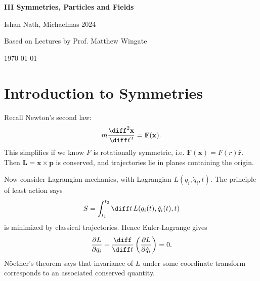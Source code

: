 \documentclass[12pt]{article}
\begin{document}
\hypersetup{pageanchor=false}
\begin{titlepage}
	\begin{center}
		\vspace*{1em}
		\Huge
		\textbf{III Symmetries, Particles and Fields}

		\vspace{1em}
		\large
		Ishan Nath, Michaelmas 2024

		\vspace{1.5em}

		\Large

		Based on Lectures by Prof. Matthew Wingate

		\vspace{1em}

		\large
		\today
	\end{center}
	
\end{titlepage}
\hypersetup{pageanchor=true}

\tableofcontents

\newpage


\section{Introduction to Symmetries}%
\label{sec:intro_sym}

Recall Newton's second law:
\[
m \frac{\diff^2 \mathbf{x}}{\diff t^2} = \mathbf{F}(\mathbf{x}).
\]
This simplifies if we know $F$ is rotationally symmetric, i.e. $\mathbf{F}(\mathbf{x}) = F(r) \mathbf{\hat r}$. Then $\mathbf{L} = \mathbf{x} \times \mathbf{p}$ is conserved, and trajectories lie in planes containing the origin.

Now consider Lagrangian mechanics, with Lagrangian $L(q_i, \dot q_i, t)$. The principle of least action says
\[
S = \int_{t_1}^{t_2} \diff t \, L(q_i(t), \dot q_i(t), t)
\]
is minimized by classical trajectories. Hence Euler-Lagrange gives
\[
\frac{\partial L}{\partial q_i} - \frac{\diff}{\diff t} \left( \frac{\partial L}{\partial \dot q_i} \right) = 0.
\]
N\"oether's theorem says that invariance of $L$ under some coordinate transform corresponds to an associated conserved quantity.
\end{document}
